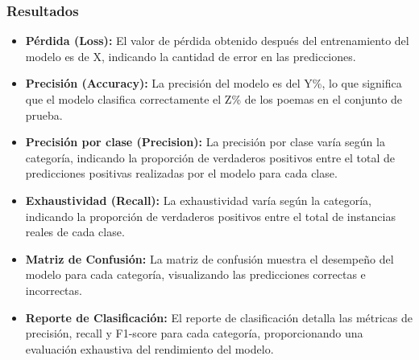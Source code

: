 \subsubsection*{Resultados}
\begin{itemize}
    \item \textbf{Pérdida (Loss):} El valor de pérdida obtenido después del entrenamiento del modelo es de X, indicando la cantidad de error en las predicciones.
    \item \textbf{Precisión (Accuracy):} La precisión del modelo es del Y\%, lo que significa que el modelo clasifica correctamente el Z\% de los poemas en el conjunto de prueba.
    \item \textbf{Precisión por clase (Precision):} La precisión por clase varía según la categoría, indicando la proporción de verdaderos positivos entre el total de predicciones positivas realizadas por el modelo para cada clase.
    \item \textbf{Exhaustividad (Recall):} La exhaustividad varía según la categoría, indicando la proporción de verdaderos positivos entre el total de instancias reales de cada clase.
    \item \textbf{Matriz de Confusión:} La matriz de confusión muestra el desempeño del modelo para cada categoría, visualizando las predicciones correctas e incorrectas.
    \item \textbf{Reporte de Clasificación:} El reporte de clasificación detalla las métricas de precisión, recall y F1-score para cada categoría, proporcionando una evaluación exhaustiva del rendimiento del modelo.
\end{itemize}